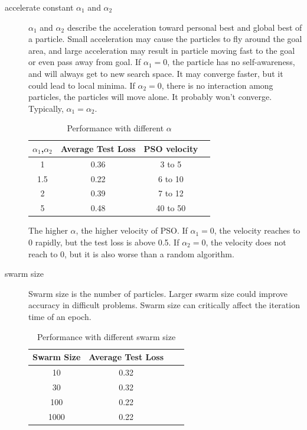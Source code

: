 \documentclass[12pt]{article}
\begin{document}
\begin{description}
\item[accelerate constant $\alpha_1$ and $\alpha_2$ ] 

$\alpha_1$ and $\alpha_2$ describe the acceleration toward personal best and global best of a particle.
Small acceleration may cause the particles to fly around the goal area, and large acceleration may result in particle moving fast to the goal or even pass away from goal. If $\alpha_1 = 0$, the particle has no self-awareness, and will always get to new search space. It may converge faster, but it could lead to local minima. If $\alpha_2=0$, there is no interaction among particles, the particles will move alone. It probably won't converge.
Typically, $\alpha_1 = \alpha_2$.

\begin{table}[!ht]
\centering
\begin{tabular}{@{}cccc@{}}
\toprule
$\alpha_1$,$\alpha_2$ & Average Test Loss & PSO velocity \\ \midrule
1 & 0.36 & 3 to 5  \\
1.5 & 0.22  &  6 to 10  \\
2 & 0.39  &   7 to 12 \\
5  & 0.48  &  40 to 50  \\
\bottomrule
\end{tabular}
\caption{Performance with different $\alpha$}
\label{t_alpha}
\end{table}
The higher $\alpha$, the higher velocity of PSO.
If $\alpha_1 = 0$, the velocity reaches to 0 rapidly, but the test loss is above 0.5. If $\alpha_2 = 0$, the velocity does not reach to 0, but it is also worse than a random algorithm.

\end{description}
\begin{description}
\item[swarm size]
Swarm size is the number of particles. Larger swarm size could improve accuracy in difficult problems. Swarm size can critically affect the iteration time of an epoch.
\begin{table}[!ht]
\centering
\begin{tabular}{@{}cccc@{}}
\toprule
Swarm Size & Average Test Loss  \\ \midrule
10 & 0.32 \\
30 & 0.32    \\
100 & 0.22  \\
1000  & 0.22   \\
\bottomrule
\end{tabular}
\caption{Performance with different swarm size}
\label{t_swarm}
\end{table}
\end{description}
\end{document}
